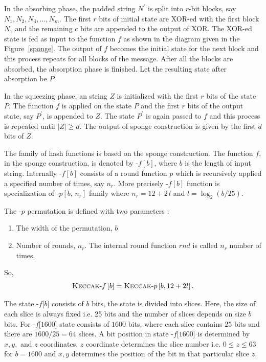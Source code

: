 In the absorbing phase, the padded string $N^\prime$ is split into $r$-bit blocks, say $N_1, N_2, N_3,\ldots,N_m$. The first $r$ bits of initial state are XOR-ed with the first block $N_1$ and the remaining $c$ bits are appended to the output of XOR. The XOR-ed state is fed as input to the function $f$ as shown in the diagram given in the Figure~\ref{sponge}. The output of $f$ becomes the initial state for the next block and this process repeats for all blocks of the message. After all the blocks are absorbed, the absorption phase is finished. Let the resulting state after absorption be $P$. 

In the squeezing phase, an string $Z$ is initialized with the first $r$ bits of the state $P$. The function $f$ is applied on the state $P$ and the first $r$ bits of the output state, say $P^\prime$, is appended to $Z$. The state $P^\prime$ is again passed to $f$ and this process is repeated until $|Z| \geq d$. The output of sponge construction is given by the first $d$ bits of $Z$.

The \Keccak{} family of hash functions is based on the sponge construction. The function $f$, in the sponge construction, is denoted by \Keccak-$f\left[b\right]$, where $b$ is the length of input string. Internally \Keccak-$f\left[b\right]$ consists of a round function $p$ which is recursively applied a specified number of times, say $n_r$. More precisely \Keccak-$f\left[b\right]$ function is specialization of \Keccak-$p\left[b,\,n_r\right]$ family where $n_r = 12 + 2\,l$ and $l = \log_2 (b/25)$.

The \KECCAK-$p$ permutation is defined with two parameters :
\begin{enumerate}
	\item The width of the permutation, $b$
	\item Number of rounds, $n_r$. The internal round function $rnd$ is called $n_r$ number of times.
\end{enumerate}

So,
\[
	\mbox{\textsc{Keccak}}\text{-}f\left[b\right] = \mbox{\textsc{Keccak}}\text{-}p\left[b,  12 + 2l\right].
\]

The state \KECCAK-$f$[$b$] consists of $b$ bits, the state is divided into slices. Here, the size of each slice is always fixed i.e. 25 bits and the number of slices depends on size $b$ bits. For \KECCAK-$f$[$1600$] state consists of $1600$ bits, where each slice contains $25$ bits and there are $1600/25 = 64$ slices. A bit position in state \KECCAK-$f$[$1600$] is determined by $x, y, $ and $z$ coordinates. $z$ coordinate determines the slice number i.e. $0 \leq z \leq 63$ for $b = 1600$ and $x, y$ determines the position of the bit in that particular slice $z$.


